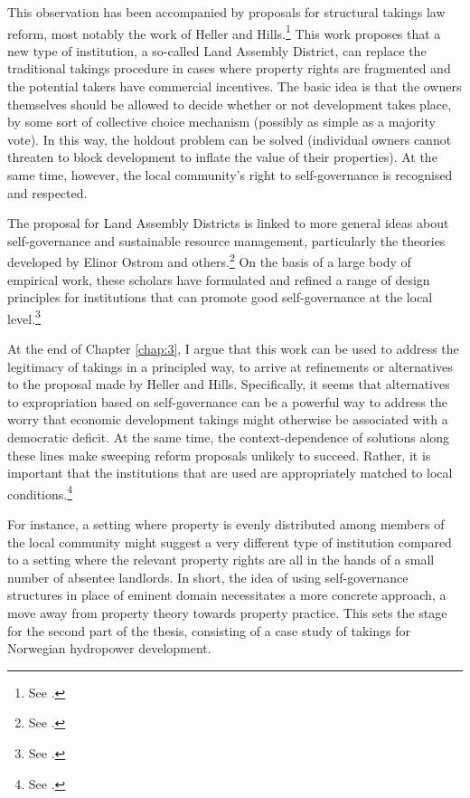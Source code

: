 This observation has been accompanied by proposals for structural takings law reform, most notably the work of Heller and Hills.\footnote{See \cite{heller08}.} This work proposes that a new type of institution, a so-called Land Assembly District, can replace the traditional takings procedure in cases where property rights are fragmented and the potential takers have commercial incentives. The basic idea is that the owners themselves should be allowed to decide whether or not development takes place, by some sort of collective choice mechanism (possibly as simple as a majority vote). In this way, the holdout problem can be solved (individual owners cannot threaten to block development to inflate the value of their properties). At the same time, however, the local community's right to self-governance is recognised and respected.
 
The proposal for Land Assembly Districts is linked to more general ideas about self-governance and sustainable resource management, particularly the theories developed by Elinor Ostrom and others.\footnote{See \cite{ostrom90}.} On the basis of a large body of empirical work, these scholars have formulated and refined a range of design principles for institutions that can promote good self-governance at the local level.\footnote{See \cite{cox10}.} 

At the end of Chapter \ref{chap:3}, I argue that this work can be used to address the legitimacy of takings in a principled way, to arrive at refinements or alternatives to the proposal made by Heller and Hills. Specifically, it seems that alternatives to expropriation based on self-governance can be a powerful way to address the worry that economic development takings might otherwise be associated with a democratic deficit. At the same time, the context-dependence of solutions along these lines make sweeping reform proposals unlikely to succeed. Rather, it is important that the institutions that are used are appropriately matched to local conditions.\footnote{See \cite[92]{ostrom90}.}

For instance, a setting where property is evenly distributed among members of the local community might suggest a very different type of institution compared to a setting where the relevant property rights are all in the hands of a small number of absentee landlords. In short, the idea of using self-governance structures in place of eminent domain necessitates a more concrete approach, a move away from property theory towards property practice. This sets the stage for the second part of the thesis, consisting of a case study of takings for Norwegian hydropower development. 

